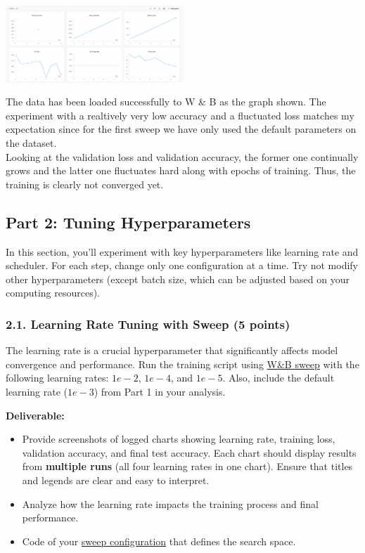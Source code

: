 \documentclass[11pt, oneside]{article}   	%
\begin{document}
\begin{center}
    \includegraphics[width=0.5\textwidth]{p1p1_pic/Logged_Charts.png}
\end{center}

The data has been loaded successfully to W \& B as the graph shown. 
The experiment with a realtively very low accuracy and a fluctuated loss matches my expectation since for the first sweep we have only used the default parameters on the dataset.
\\
Looking at the validation loss and validation accuracy, the former one continually grows and the latter one fluctuates hard along with epochs of training. Thus, the training is clearly not converged yet.

\subsection*{Part 2: Tuning Hyperparameters}
In this section, you'll experiment with key hyperparameters like learning rate and scheduler. For each step, change only one configuration at a time. Try not modify other hyperparameters (except batch size, which can be adjusted based on your computing resources).

\subsubsection*{2.1. Learning Rate Tuning with Sweep (5 points)}
 The learning rate is a crucial hyperparameter that significantly affects model convergence and performance.  Run the training script using \href{https://docs.wandb.ai/guides/sweeps/walkthrough}{W\&B sweep} with the following learning rates: $1e-2$, $1e-4$, and $1e-5$. Also, include the default learning rate ($1e-3$) from Part 1 in your analysis.

\noindent\textbf{Deliverable:}
\begin{itemize}
    \item Provide screenshots of logged charts showing learning rate, training loss, validation accuracy, and final test accuracy. Each chart should display results from \textbf{multiple runs} (all four learning rates in one chart). Ensure that titles and legends are clear and easy to interpret.
    \item Analyze how the learning rate impacts the training process and final performance.
    \item Code of your \href{https://docs.wandb.ai/guides/sweeps/define-sweep-configuration}{sweep configuration} that defines the search space.
\end{itemize}
\end{document}
